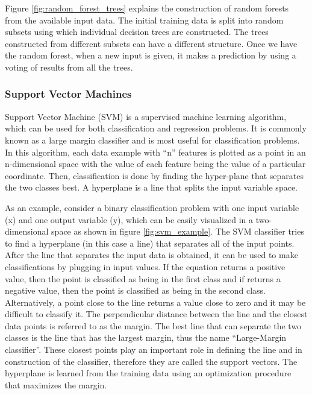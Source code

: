 \documentclass[11pt,openright]{report}
\begin{document}
Figure \ref{fig:random_forest_trees} explains the construction of random forests from the available input data. The initial training data is split into random subsets using which individual decision trees are constructed. The trees constructed from different subsets can have a different structure. Once we have the random forest, when a new input is given, it makes a prediction by using a voting of results from all the trees.

\subsubsection {Support Vector Machines }

Support Vector Machine (SVM) is a supervised machine learning algorithm, which can be used for both classification and regression problems. It is commonly known as a large margin classifier and is most useful for classification problems. In this algorithm, each data example with ``n'' features is plotted as a point in an n-dimensional space with the value of each feature being the value of a particular coordinate. Then, classification is done by finding the hyper-plane that separates the two classes best. A hyperplane is a line that splits the input variable space.

As an example, consider a binary classification problem with one input variable (x) and one output variable (y), which can be easily visualized in a two-dimensional space as shown in figure \ref{fig:svm_example}. The SVM classifier tries to find a hyperplane (in this case a line) that separates all of the input points. After the line that separates the input data is obtained, it can be used to make classifications by plugging in input values. If the equation returns a positive value, then the point is classified as being in the first class and if returns a negative value, then the point is classified as being in the second class. Alternatively, a point close to the line returns a value close to zero and it may be difficult to classify it. The perpendicular distance between the line and the closest data points is referred to as the margin. The best line that can separate the two classes is the line that has the largest margin, thus the name ``Large-Margin classifier''. These closest points play an important role in defining the line and in construction of the classifier, therefore they are called the support vectors. The hyperplane is learned from the training data using an optimization procedure that maximizes the margin.
\end{document}
